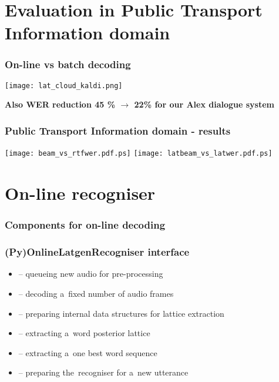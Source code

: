 \section[Evaluation in PTI]{Evaluation in Public Transport Information domain}%

\begin{frame}\frametitle{On-line vs batch decoding} 
    \begin{center}
        \texttt{[image: lat\_cloud\_kaldi.png]}
    \end{center}
    \bf {Also WER reduction 45 \% $\longrightarrow$ 22\%} for our Alex dialogue system 
\end{frame}

\begin{frame}\frametitle{Public Transport Information domain - results} 
    \texttt{[image: beam\_vs\_rtfwer.pdf.ps]}
    \texttt{[image: latbeam\_vs\_latwer.pdf.ps]}
\end{frame}


\section{On-line recogniser} %

\begin{frame}\frametitle{Components for on-line decoding} 
    \begin{center}
        
    \end{center}
\end{frame}

\begin{frame}\frametitle{(Py)OnlineLatgenRecogniser interface} 
    \begin{itemize}
        \item {} -- queueing new audio for pre-processing
        \item {} -- decoding a~fixed number of audio frames
        \item {} -- preparing internal data structures for lattice extraction
        \item {} -- extracting a~word posterior lattice
        \item {} -- extracting a~one best word sequence
        \item {} -- preparing the~recogniser for a~new utterance
    \end{itemize}
\end{frame}

